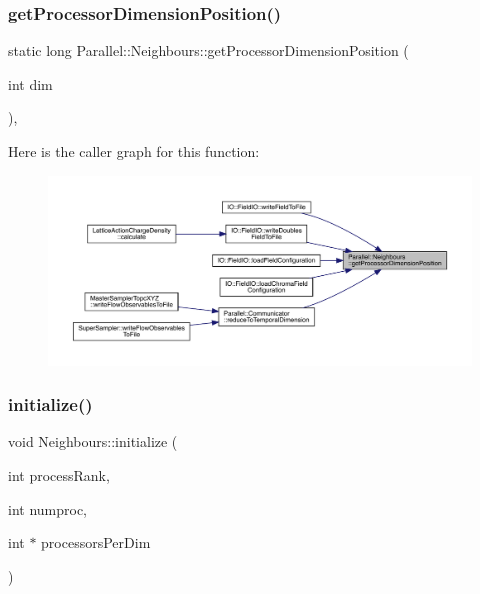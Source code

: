 \subsubsection{\texorpdfstring{getProcessorDimensionPosition()}{getProcessorDimensionPosition()}}
{\footnotesize\ttfamily static long Parallel\+::\+Neighbours\+::get\+Processor\+Dimension\+Position (\begin{DoxyParamCaption}\item[{int}]{dim }\end{DoxyParamCaption})\hspace{0.3cm}{\ttfamily [inline]}, {\ttfamily [static]}}

Here is the caller graph for this function\+:
\nopagebreak
\begin{figure}[H]
\begin{center}
\leavevmode
\includegraphics[width=350pt]{class_parallel_1_1_neighbours_ad1a2a616b4089eded3545faf11409b85_icgraph}
\end{center}
\end{figure}
\mbox{\label{class_parallel_1_1_neighbours_a59e68da5867bfa27a867ed0b443267d7}} 
\subsubsection{\texorpdfstring{initialize()}{initialize()}}
{\footnotesize\ttfamily void Neighbours\+::initialize (\begin{DoxyParamCaption}\item[{int}]{process\+Rank,  }\item[{int}]{numproc,  }\item[{int $\ast$}]{processors\+Per\+Dim }\end{DoxyParamCaption})\hspace{0.3cm}{\ttfamily [static]}}



